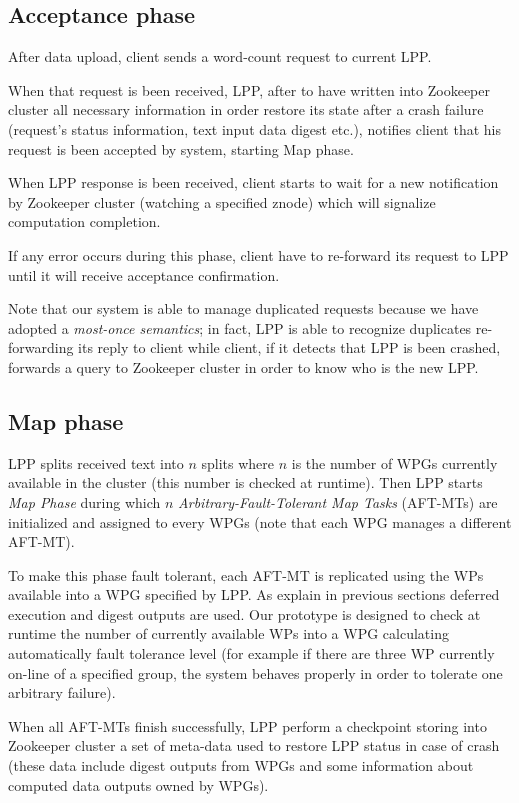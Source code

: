 \documentclass[sigchi]{acmart}
\begin{document}
\subsection{Acceptance phase}

After data upload, client sends a word-count request to current LPP. 

When that request is been received, LPP, after to have written into Zookeeper cluster all necessary information  in order restore its state after a crash failure (request's status information, text input data digest etc.),  notifies client that his request is been accepted by system, starting Map phase.

When LPP response is been received, client starts to wait for a new notification by Zookeeper cluster (watching a specified znode) which will signalize computation completion.

If any error occurs during this phase, client have to re-forward its request to LPP until it will receive acceptance confirmation. 

Note that our system is able to manage duplicated requests because we have adopted a \textit{most-once semantics}; in fact, LPP is able to recognize duplicates re-forwarding its reply to client while client, if it detects that LPP is been crashed, forwards a query to Zookeeper cluster in order to know who is the new LPP.

\subsection{Map phase}

LPP splits received text into $n$ splits where $n$ is the number of WPGs currently available in the cluster (this number is checked at runtime). Then LPP starts \textit{Map Phase} during which $n$ \textit{Arbitrary-Fault-Tolerant Map Tasks} (AFT-MTs) are initialized and assigned to every WPGs (note that each WPG manages a different AFT-MT). 

To make this phase fault tolerant, each AFT-MT is replicated using the WPs available into a WPG specified by LPP. As explain in previous sections deferred execution and digest outputs are used. Our prototype is designed to check at runtime the number of currently available WPs into a WPG calculating automatically fault tolerance level (for example if there are three WP currently on-line of a specified group, the system behaves properly in order to tolerate one arbitrary failure).

When all AFT-MTs finish successfully, LPP perform a checkpoint storing into Zookeeper cluster a set of meta-data used to restore LPP status in case of crash (these data include digest outputs from WPGs and some information about computed data outputs owned by WPGs). 
\end{document}
